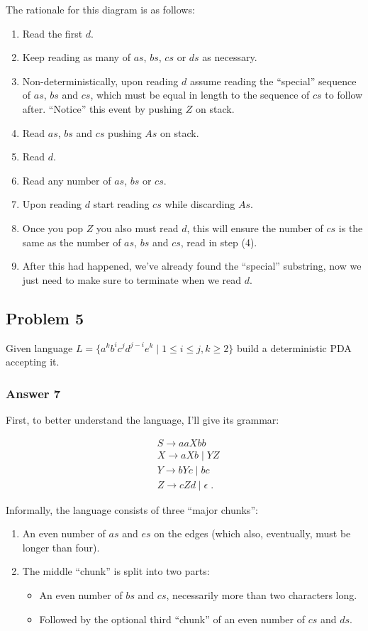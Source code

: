 \documentclass[11pt]{article}
\begin{document}
The rationale for this diagram is as follows:
\begin{enumerate}
\item Read the first $d$.
\item Keep reading as many of $as$, $bs$, $cs$ or $ds$ as necessary.
\item Non-deterministically, upon reading $d$ assume reading the
``special'' sequence of $as$, $bs$ and $cs$, which must be equal
in length to the sequence of $cs$ to follow after.
``Notice'' this event by pushing $Z$ on stack.
\item Read $as$, $bs$ and $cs$ pushing $As$ on stack.
\item Read $d$.
\item Read any number of $as$, $bs$ or $cs$.
\item Upon reading $d$ start reading $cs$ while discarding $As$.
\item Once you pop $Z$ you also must read $d$, this will ensure the number of
$cs$ is the same as the number of $as$, $bs$ and $cs$, read in step (4).
\item After this had happened, we've already found the ``special'' substring,
now we just need to make sure to terminate when we read $d$.
\end{enumerate}

\subsection{Problem 5}
\label{sec-1-5}
Given language $L=\{a^kb^ic^jd^{j-i}e^k \;|\; 1 \leq i \leq j, k \geq 2 \}$
build a deterministic PDA accepting it.

\subsubsection{Answer 7}
\label{sec-1-5-1}
First, to better understand the language, I'll give its grammar:

\begin{align*}
  &S \to aaXbb \\
  &X \to aXb \;|\; YZ \\
  &Y \to bYc \;|\; bc \\
  &Z \to cZd \;|\; \epsilon \;.
\end{align*}

Informally, the language consists of three ``major chunks'':
\begin{enumerate}
\item An even number of $as$ and $es$ on the edges (which also, eventually,
must be longer than four).
\item The middle ``chunk'' is split into two parts:
\begin{itemize}
\item An even number of $bs$ and $cs$, necessarily more than two characters
long.
\item Followed by the optional third ``chunk'' of an even number of $cs$ and
$ds$.
\end{itemize}
\end{enumerate}
\end{document}

